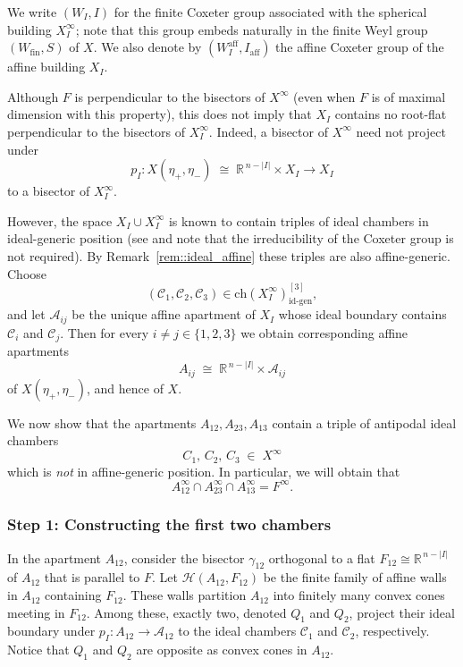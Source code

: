 \documentclass[11pt]{amsart}
\newcommand{\Ch}{\mathrm{ch}}
\theoremstyle{plain}
\theoremstyle{definition}
\theoremstyle{remark}
\begin{document}
	\medskip
	
	We write \((W_I, I)\) for the finite Coxeter group associated with the 
	spherical building \(X_I^\infty\); note that this group embeds naturally in the 
	finite Weyl group \((W_{\mathrm{fin}}, S)\) of \(X\).  
	We also denote by \((W^{\mathrm{aff}}_I, I_{\mathrm{aff}})\) the affine Coxeter 
	group of the affine building \(X_I\).
	
	\medskip
	
	Although \(F\) is perpendicular to the bisectors of \(X^{\infty}\) (even when \(F\) is of maximal dimension with this property), this does not imply that \(X_{I}\) contains no root-flat perpendicular to the bisectors of \(X_{I}^{\infty}\).  Indeed, a bisector of \(X^\infty\) need not project under
	\[
	p_I : X(\eta_{+}, \eta_{-}) \;\cong\; \mathbb{R}^{\,n - |I|} \times X_I 
	\longrightarrow X_I
	\]
	to a bisector of \(X_I^\infty\).
	
	\medskip
	
	However, the space \(X_I \cup X_I^\infty\) is known to contain triples of ideal 
	chambers in ideal-generic position (see \cite[Proposition~5.6]{CiBars} and note that the irreducibility of the Coxeter group is not required).
	By Remark~\ref{rem::ideal_affine} these triples are also affine-generic.  
	Choose
	\[
	(\mathcal{C}_1, \mathcal{C}_2, \mathcal{C}_3) 
	\in \Ch(X_I^\infty)_{\mathrm{id\text{-}gen}}^{[3]},
	\]
	and let \(\mathcal{A}_{ij}\) be the unique affine apartment of \(X_I\) whose 
	ideal boundary contains \(\mathcal{C}_i\) and \(\mathcal{C}_j\).  
	Then for every \(i \neq j \in \{1,2,3\}\) we obtain corresponding affine 
	apartments
	\[
	A_{ij} \;\cong\; \mathbb{R}^{\,n - |I|} \times \mathcal{A}_{ij}
	\]
	of \(X(\eta_{+}, \eta_{-})\), and hence of \(X\).
	
	\medskip
	
	We now show that the apartments \(A_{12}, A_{23}, A_{13}\) contain a triple of 
	antipodal ideal chambers
	\[
	C_1,\, C_2,\, C_3 \;\in\; X^\infty
	\]
	which is \emph{not} in affine-generic position. In particular, we will obtain that 
	$$A_{12}^\infty \cap A_{23}^\infty \cap A_{13}^\infty = F^\infty.$$
	\subsubsection*{Step 1: Constructing the first two chambers}
	In the apartment \(A_{12}\), consider the bisector \(\gamma_{12}\) orthogonal 
	to a flat \(F_{12} \cong \mathbb{R}^{\,n - |I|}\) of $A_{12}$ that is parallel to $F$.  
	Let \(\mathcal H(A_{12},F_{12})\) be the finite family of affine walls in 
	\(A_{12}\) containing \(F_{12}\).  
	These walls partition \(A_{12}\) into finitely many convex cones meeting in 
	\(F_{12}\).  
	Among these, exactly two, denoted \(Q_1\) and \(Q_2\), project their ideal boundary under 
	\(p_I : A_{12} \to \mathcal A_{12}\) to the ideal chambers 
	\(\mathcal C_1\) and \(\mathcal C_2\), respectively. Notice that \(Q_1\) and \(Q_2\) are opposite as convex cones in $A_{12}$.
	
\end{document}

